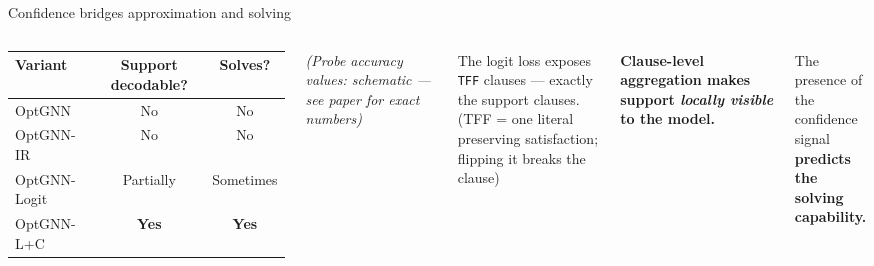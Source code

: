 \documentclass[aspectratio=169,10pt,dvipsnames]{beamer}
\begin{document}
\begin{frame}{Confidence bridges approximation and solving}

\begin{columns}[T]
\small\renewcommand{\arraystretch}{1.4}
\begin{tabular}{@{}p{2.8cm}cc@{}}
\toprule
\textbf{Variant} & \textbf{Support decodable?} & \textbf{Solves?} \\
\midrule
OptGNN & \textcolor{emphcolor}{No} & \textcolor{emphcolor}{No} \\
OptGNN-IR & \textcolor{emphcolor}{No} & \textcolor{emphcolor}{No} \\
OptGNN-Logit & \textcolor{orange!80!black}{Partially} & \textcolor{orange!80!black}{Sometimes} \\
OptGNN-L+C & \textcolor{ForestGreen!70!black}{\textbf{Yes}} & \textcolor{ForestGreen!70!black}{\textbf{Yes}} \\
\bottomrule
\end{tabular}

\medskip\small
\textit{(Probe accuracy values: schematic — see paper for exact numbers)}

\small
The logit loss exposes \texttt{TFF} clauses — exactly the support clauses.\\
(TFF = one literal preserving satisfaction; flipping it breaks the clause)

\medskip
\textbf{Clause-level aggregation makes support \textit{locally visible} to the model.}

\medskip
\begin{block}{}
The presence of the confidence signal\\
\textbf{predicts the solving capability.}
\end{block}
\end{columns}

\end{frame}
\end{document}
